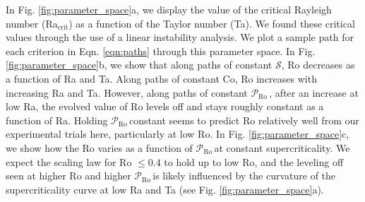 \documentclass[twocolumn, amsmath, amsfonts, amssymb]{aastex62}
\newcommand{\pro}{\ensuremath{\mathcal{P}_{\text{Ro}}\,}}
\begin{document}
\label{sec:results}
In Fig. \ref{fig:parameter_space}a, we display the value of the critical Rayleigh number 
(Ra$_{\text{crit}}$) as a function of the Taylor number (Ta). We found these critical
values through the use of a linear instability analysis. We plot a sample path for
each criterion in Eqn. \ref{eqn:paths} through
this parameter space.
In Fig. \ref{fig:parameter_space}b, we show that along paths of
constant $\mathcal{S}$, Ro 
decreases as a function of Ra and Ta. Along paths of constant Co, Ro increases
with increasing Ra and Ta. However, along paths of constant \pro, 
after an increase at low Ra, the evolved value of Ro levels off and stays roughly constant
as a function of Ra. Holding \pro constant seems to predict Ro relatively
well from our experimental trials here, particularly at low Ro. 
In Fig. \ref{fig:parameter_space}c, we
show how the Ro varies as a function of \pro at constant supercriticality.
We expect the scaling law for Ro $\leq 0.4$ to hold up to low Ro, and the
leveling off seen at higher Ro and higher \pro is likely influenced by the
curvature of the supercriticality curve at low Ra and Ta (see Fig. \ref{fig:parameter_space}a).
\end{document}
